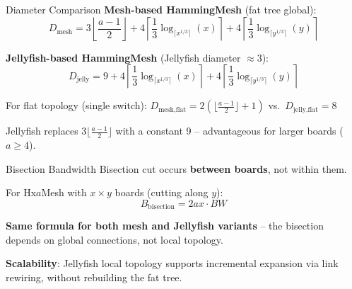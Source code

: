 \documentclass[t]{beamer}
\begin{document}
\begin{frame}{Diameter Comparison}
    \textbf{Mesh-based HammingMesh} (fat tree global):
    \[D_{\text{mesh}} =
    3\left\lfloor \frac{a-1}{2} \right\rfloor
    + 4\left\lceil \frac{1}{3}\log_{\lceil x^{1/3}\rceil}\!\left(x\right) \right\rceil
    + 4\left\lceil \frac{1}{3}\log_{\lceil y^{1/3}\rceil}\!\left(y\right) \right\rceil
    \]

    \vspace{0.2cm}

    \textbf{Jellyfish-based HammingMesh} (Jellyfish diameter $\approx 3$):
    \[D_{\text{jelly}} =
    9
    + 4\left\lceil \frac{1}{3}\log_{\lceil x^{1/3}\rceil}\!\left(x\right) \right\rceil
    + 4\left\lceil \frac{1}{3}\log_{\lceil y^{1/3}\rceil}\!\left(y\right) \right\rceil
    \]

    \vspace{0.2cm}

    For flat topology (single switch): $D_{\text{mesh,flat}} = 2(\lfloor\frac{a-1}{2}\rfloor + 1)$ vs.\ $D_{\text{jelly,flat}} = 8$

    \vspace{0.2cm}

    \footnotesize
    Jellyfish replaces $3\lfloor\frac{a-1}{2}\rfloor$ with a constant 9 -- advantageous for larger boards ($a \geq 4$).
\end{frame}

\begin{frame}{Bisection Bandwidth}
    Bisection cut occurs \textbf{between boards}, not within them.

    \vspace{0.2cm}

    For Hx$a$Mesh with $x \times y$ boards (cutting along $y$):
    \[B_{\text{bisection}} = 2ax \cdot BW\]

    \vspace{0.2cm}

    \textbf{Same formula for both mesh and Jellyfish variants} -- the bisection depends on global connections, not local topology.

    \vspace{0.3cm}

    \textbf{Scalability}: Jellyfish local topology supports incremental expansion via link rewiring, without rebuilding the fat tree.
\end{frame}
\end{document}
